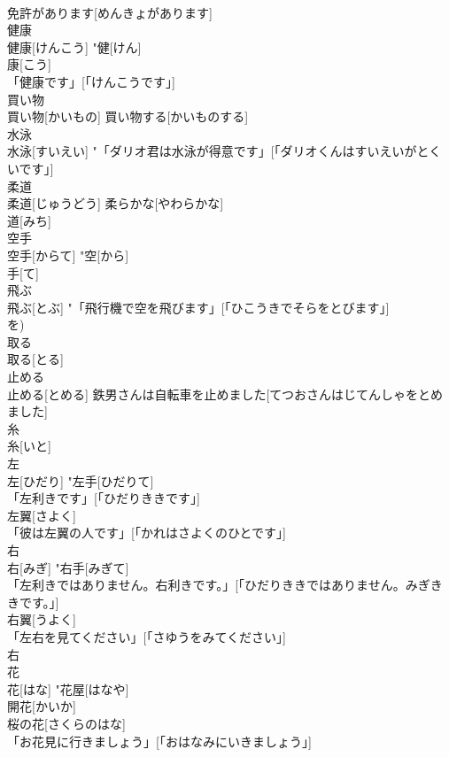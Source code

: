 \documentclass[8pt]{extreport}
\begin{document}
\begin{CJK}{UTF8}{min}
\\	免許があります[めんきょがあります] 
\\	健康	
\\	健康[けんこう]	"健[けん] 
\\	康[こう] 
\\	「健康です」[「けんこうです」] 
\\	買い物	
\\	買い物[かいもの]	買い物する[かいものする] 
\\	水泳	
\\	水泳[すいえい]	"「ダリオ君は水泳が得意です」[「ダリオくんはすいえいがとくいです」] 
\\	柔道	
\\	柔道[じゅうどう]	柔らかな[やわらかな] 
\\	道[みち] 
\\	空手	
\\	空手[からて]	"空[から] 
\\	手[て] 
\\	飛ぶ	
\\	飛ぶ[とぶ]	"「飛行機で空を飛びます」[「ひこうきでそらをとびます」] 
\\	を)
\\	取る	
\\	取る[とる]	
\\	止める	
\\	止める[とめる]	鉄男さんは自転車を止めました[てつおさんはじてんしゃをとめました] 
\\	糸	
\\	糸[いと]	
\\	左	
\\	左[ひだり]	"左手[ひだりて] 
\\	「左利きです」[「ひだりききです」] 
\\	左翼[さよく] 
\\	「彼は左翼の人です」[「かれはさよくのひとです」] 
\\	右	
\\	右[みぎ]	"右手[みぎて] 
\\	「左利きではありません。右利きです。」[「ひだりききではありません。みぎききです。」] 
\\	右翼[うよく] 
\\	「左右を見てください」[「さゆうをみてください」] 
\\	右 
\\	花	
\\	花[はな]	"花屋[はなや] 
\\	開花[かいか] 
\\	桜の花[さくらのはな] 
\\	「お花見に行きましょう」[「おはなみにいきましょう」] 

\end{CJK}
\end{document}
